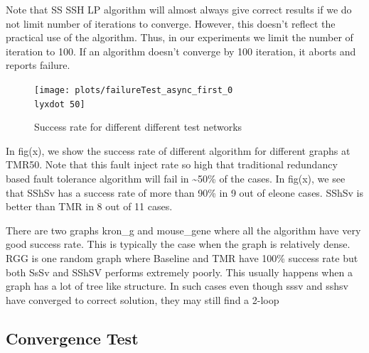 Note that SS SSH LP algorithm will almost always give correct results
if we do not limit number of iterations to converge. However, this
doesn't reflect the practical use of the algorithm. Thus, in our experiments
we limit the number of iteration to 100. If an algorithm doesn't converge
by 100 iteration, it aborts and reports failure. 

\begin{figure}
\texttt{[image: plots/failureTest\_async\_first\_0\\lyxdot 50]}\caption{Success rate for different different test networks }

\end{figure}

In fig(x), we show the success rate of different algorithm for different
graphs at TMR50. Note that this fault inject rate so high that traditional
redundancy based fault tolerance algorithm will fail in \textasciitilde{}50\%
of the cases. In fig(x), we see that SShSv has a success rate of more
than 90\% in 9 out of eleone cases. SShSv is better than TMR in 8
out of 11 cases. 

There are two graphs kron\_g and mouse\_gene where all the algorithm
have very good success rate. This is typically the case when the graph
is relatively dense. RGG is one random graph where Baseline and TMR
have 100\% success rate but both SsSv and SShSV performs extremely
poorly. This usually happens when a graph has a lot of tree like structure.
In such cases even though sssv and sshsv have converged to correct
solution, they may still find a 2-loop 

\subsection{Convergence Test}

